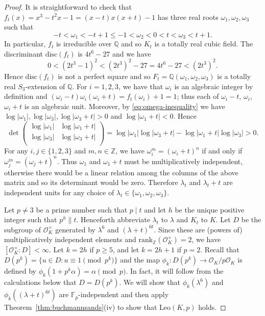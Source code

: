 \documentclass[12pt]{amsart}
\theoremstyle{plain}
\theoremstyle{remark}
\theoremstyle{definition}
\newcommand{\Z}{\mathbb{Z}}
\newcommand{\Q}{\mathbb{Q}}
\newcommand{\F}{\mathbb{F}}
\newcommand{\rank}{\mathrm{rank}}
\newcommand{\Leo}{\mathrm{Leo}}
\numberwithin{equation}{section}
\begin{document}
\begin{proof}
It is straightforward to check that $f_{t}(x) = x^{3} - t^{2}x-1 = (x-t)x(x+t)-1$ has three real roots 
$\omega_{1}, \omega_{2}, \omega_{3}$ such that
\begin{equation}\label{eq:omega-inequality}
-t < \omega_{1} < -t+1 \leq -1 < \omega_{2} < 0 < t < \omega_{3} < t+1. 
\end{equation}
In particular, $f_{t}$ is irreducible over $\Q$ and so $K_{t}$ is a totally real cubic field.
The discriminant $\mathrm{disc}(f_{t})$ is $4t^{6}-27$ and we have
\[
0 <  (2t^{3}-1)^{2} <  (2t^{3})^{2} -27 = 4t^{6}-27 < (2t^{3})^{2}.
\]
Hence $\mathrm{disc}(f_{t})$ is not a perfect square and so 
$F_{t}=\Q(\omega_{1},\omega_{2},\omega_{3})$ 
is a totally real $S_{3}$-extension of $\Q$.
For $i=1,2,3$, we have that $\omega_{i}$ is an algebraic integer by definition and 
$(\omega_{i}-t)\omega_{i}(\omega_{i}+t) = f_{t}(\omega_{i})+1=1$;
thus each of $\omega_{i}-t$, $\omega_{i}$, $\omega_{i}+t$ is an algebraic unit. 
Moreover, by \eqref{eq:omega-inequality} we have 
$\log |\omega_{1}|, \log |\omega_{3}|, \log |\omega_{3} + t| > 0$
and $ \log |\omega_{1} + t| < 0$.
Hence 
\[
\det 
\begin{pmatrix}
\log |\omega_{1}| & \log |\omega_{1} + t| \\ 
\log |\omega_{3}| & \log |\omega_{3} + t| \\ 
\end{pmatrix}
= \log |\omega_{1}|  \log |\omega_{3} + t| - \log |\omega_{1} + t|\log |\omega_{3}| > 0.
\]
For any $i,j \in \{1,2,3\}$ and $m,n \in \Z$,
we have $\omega_{i}^{m}=(\omega_{i}+t)^{n}$ if and only if 
$\omega_{j}^{m}=(\omega_{j}+t)^{n}$.
Thus $\omega_{1}$ and $\omega_{1}+t$ must be multiplicatively independent, 
otherwise there would be a linear relation among the columns of the above matrix and so its determinant
would be zero.
Therefore $\lambda_{t}$ and $\lambda_{t}+t$ are independent units for any 
choice of $\lambda_{t} \in \{ \omega_{1}, \omega_{2}, \omega_{3} \}$. 

Let $p \neq 3$ be a prime number such that $p \mid t$ and 
let $h$ be the unique positive integer such that $p^{h} \parallel t$.
Henceforth abbreviate $\lambda_{t}$ to $\lambda$ and $K_{t}$ to $K$.
Let $D$ be the subgroup of $\mathcal{O}_{K}^{\times}$
generated by $\lambda^{6}$ and $(\lambda+t)^{6t}$.
Since these are (powers of) multiplicatively independent elements and
$\rank_{\Z}(\mathcal{O}_{K}^{\times})=2$, we have $[\mathcal{O}_{K}^{\times} : D] < \infty$.
Let $k=2h$ if $p \geq 5$, and let $k=2h+1$ if $p=2$.
Recall that $D(p^{k})=\{ u \in D : u \equiv 1 \pmod{p^{k}} \}$ 
and the map $\phi_{k} : D(p^{k}) \rightarrow \mathcal{O}_{K}/p\mathcal{O}_{K}$
is defined by $\phi_{k}(1+p^{k}\alpha) = \alpha \pmod{p}$.
In fact, it will follow from the calculations below that $D=D(p^{k})$.
We will show that $\phi_{k}(\lambda^{6})$ and $\phi_{k}((\lambda+t)^{6t})$
are $\F_{p}$-independent and then apply Theorem~\ref{thm:buchmannsands}(iv) 
to show that $\Leo(K,p)$ holds.


\end{proof}
\end{document}
